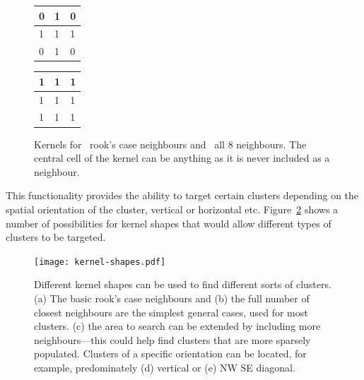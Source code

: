 \begin{figure}[tbhp]
	\centering
	\begin{subtable}[b]{0.2\textwidth}
	\centering
		\begin{tabular}{|l|l|l|}
			\hline
			0 & 1 & 0 \\
			\hline
			1 & \cellcolor{lred}1 & 1 \\
			\hline
			0 & 1 & 0 \\
			\hline
		\end{tabular}
		\caption{}\label{fig:kernel-image-rooks}
	\end{subtable}%
	\quad
	\begin{subtable}[b]{0.2\textwidth}
	\centering
		\begin{tabular}{|l|l|l|}
			\hline
			1 & 1 & 1 \\
			\hline
			1 & \cellcolor{lred}1 & 1 \\
			\hline
			1 & 1 & 1 \\
			\hline
		\end{tabular}
		\caption{}\label{fig:kernel-image-all8}
	\end{subtable}

	\caption[Kernels for rook's case and all 8 neighbours.]{Kernels
		for~ rook's case neighbours
		and~ all 8 neighbours. The central cell of the
		kernel can be anything as it is never included as a neighbour.}\label{fig:kernel-neighbours}
\end{figure}

This functionality provides the ability to target certain clusters depending on
the spatial orientation of the cluster, vertical or horizontal etc.
Figure~\ref{fig:kernel-shapes} shows a number of possibilities for kernel
shapes that would allow different types of clusters to be targeted.

\begin{figure}[htbp]
	\centering
	\texttt{[image: kernel-shapes.pdf]}

	\caption[Different kernel shapes for different clusters.]{Different kernel
		shapes can be used to find different sorts of clusters. (a) The basic
		rook's case neighbours and (b) the full number of closest neighbours
		are the simplest general cases, used for most clusters. (c) the area to
		search can be extended by including more neighbours---this could help
		find clusters that are more sparsely populated. Clusters of a specific
		orientation can be located, for example, predominately (d) vertical or
		(e) NW SE diagonal.}\label{fig:kernel-shapes}
\end{figure}

